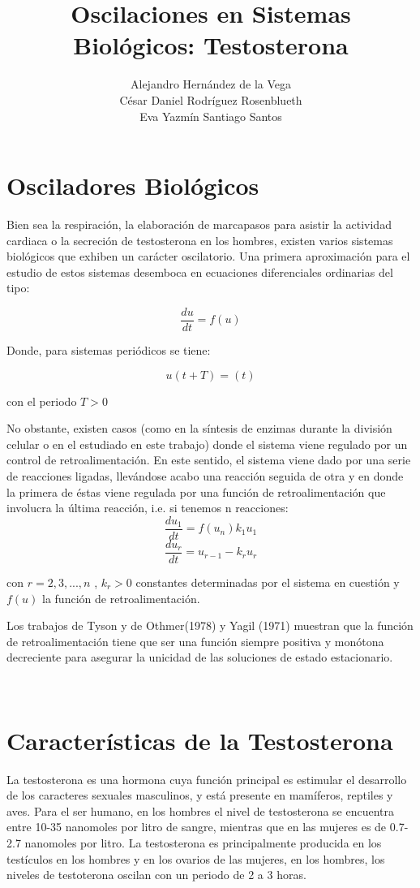 \documentclass[letter,11pt]{article}
\title{Oscilaciones en Sistemas Biológicos: Testosterona}
\author{Alejandro Hernández de la Vega \\ César Daniel Rodríguez Rosenblueth \\ Eva Yazmín Santiago Santos}
\date{}
\begin{document}
\maketitle

\tableofcontents

\pagebreak


\section{Osciladores Biológicos}

Bien sea la respiración, la elaboración de marcapasos para asistir la actividad cardiaca o la secreción de testosterona en los hombres, existen varios sistemas biológicos que exhiben un carácter oscilatorio. Una primera aproximación para el estudio de estos sistemas desemboca en ecuaciones diferenciales ordinarias del tipo:

$$\dfrac{du}{dt} = f(u)$$

Donde, para sistemas periódicos se tiene:

$$u(t+T)= (t) $$

con el periodo $T>0$

No obstante, existen casos (como en la síntesis de enzimas durante la división celular o en el estudiado en este trabajo) donde el sistema viene regulado por un control de retroalimentación. En este sentido, el sistema viene dado por una serie de reacciones ligadas, llevándose acabo una reacción seguida de otra y en donde la primera de éstas viene regulada por una función de retroalimentación que involucra la última reacción, i.e. si tenemos n reacciones:
$$ \dfrac{d u_1}{dt} = f(u_n )k_1 u_1 $$ 
$$ \dfrac{d u_r}{dt}= u_{r-1} -k_r u_r $$

con $r=2,3,...,n$ , $ k_r > 0 $ constantes determinadas por el sistema en cuestión y $ f(u)$ la función de retroalimentación.

Los trabajos de Tyson y de Othmer(1978) y Yagil (1971) muestran que la función de retroalimentación tiene que ser una función siempre positiva y monótona decreciente para asegurar la unicidad de las soluciones de estado estacionario.

\

\section{Características de la Testosterona}

La testosterona es una hormona cuya función principal es estimular el desarrollo de los caracteres sexuales masculinos, y está presente en mamíferos, reptiles y aves. Para el ser humano, en los hombres el nivel de testosterona se encuentra entre 10-35 nanomoles por litro de sangre, mientras que en las mujeres es de 0.7-2.7 nanomoles por litro. La testosterona es principalmente producida en los testículos en los hombres y en los ovarios de las mujeres, en los hombres, los niveles de testoterona oscilan con un periodo de 2 a 3 horas.
\end{document}
